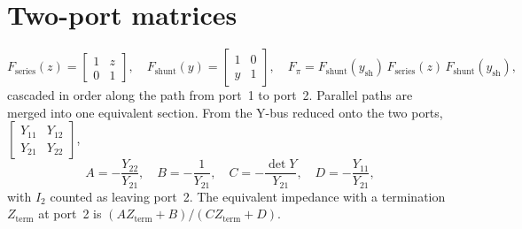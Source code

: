\section{Two-port matrices}

\[
  F_\text{series}(z) = \begin{bmatrix} 1 & z \\ 0 & 1 \end{bmatrix}, \quad
  F_\text{shunt}(y) = \begin{bmatrix} 1 & 0 \\ y & 1 \end{bmatrix}, \quad
  F_\pi = F_\text{shunt}(y_\text{sh})\,F_\text{series}(z)\,F_\text{shunt}(y_\text{sh}),
\]
cascaded in order along the path from port~1 to port~2. Parallel paths are merged into one
equivalent section. From the Y-bus reduced onto the two ports,
$\left[\begin{smallmatrix} Y_{11} & Y_{12} \\ Y_{21} & Y_{22}\end{smallmatrix}\right]$,
\[
  A = -\frac{Y_{22}}{Y_{21}}, \quad B = -\frac{1}{Y_{21}}, \quad
  C = -\frac{\det Y}{Y_{21}}, \quad D = -\frac{Y_{11}}{Y_{21}},
\]
with $I_2$ counted as leaving port~2. The equivalent impedance with a termination
$Z_\text{term}$ at port~2 is $(A Z_\text{term} + B)/(C Z_\text{term} + D)$.
